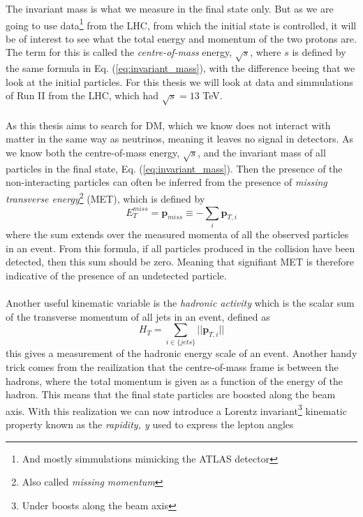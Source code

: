 \documentclass[12pt, a4paper]{book}
\begin{document}
The invariant mass is what we measure in the final state only. But as we are going to use data\footnote{And mostly simmulations mimicking the ATLAS detector} from the LHC, from which the initial state is controlled, 
it will be of interest to see what the total energy and momentum of the two protons are. The term for this is called the \textit{centre-of-mass} energy, $\sqrt s$, where $s$ is defined by the same formula in Eq. (\ref{eq:invariant_mass}), 
with the difference beeing that we look at the initial particles. For this thesis we will look at data and simmulations of Run II from the LHC, which had $\sqrt s = 13$ TeV. \\
\\As this thesis aims to search for DM, which we know does not interact with matter in the same way as neutrinos, meaning it leaves no signal in detectors. 
As we know both the centre-of-mass energy, $\sqrt s$, and the invariant mass of all particles in the final state, Eq. (\ref{eq:invariant_mass}). Then the presence of the non-interacting particles can often be 
inferred from the presence of \textit{missing transverse energy}\footnote{Also called \textit{missing momentum}} (MET), which is defined by
\begin{equation}\label{eq:MET}
    E_T^{miss} = \mathbf{p}_{miss} \equiv -\sum_i \mathbf{p}_{T,i}
\end{equation}
where the sum extends over the measured momenta of all the observed particles in an event. From this formula, if all particles produced in the collision have been detected, then this sum should be zero. Meaning that 
signifiant MET is therefore indicative of the presence of an undetected particle. \\
\\Another useful kinematic variable is the \textit{hadronic activity} which is the scalar sum of the transverse momentum of all jets in an event, defined as
\begin{equation}\label{eq:HT}
    H_T = \sum_{i\in\{jets\}} \vert\vert \mathbf{p}_{T,i}\vert\vert
\end{equation}
this gives a measurement of the hadronic energy scale of an event. Another handy trick comes from the reailization that the centre-of-mass frame is between the hadrons, where the total momentum is given as a function of the energy of the hadron. 
This means that the final state particles are boosted along the beam axis. With this realization we can now introduce a Lorentz invariant\footnote{Under boosts along the beam axis} kinematic property known as the \textit{rapidity, y} used to express the lepton angles
\end{document}
